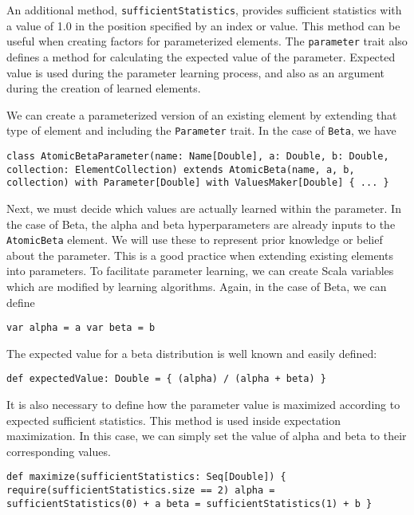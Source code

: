 An additional method,  \texttt{sufficientStatistics}, provides sufficient statistics with a value of 1.0 in the position specified by an index or value. This method can be useful when creating factors for parameterized elements. The \texttt{parameter} trait also defines a method for calculating the expected value of the parameter. Expected value is used during the parameter learning process, and also as an argument during the creation of learned elements.

We can create a parameterized version of an existing element by extending that type of element and including the \texttt{Parameter} trait. In the case of \texttt{Beta}, we have

\begin{flushleft}
\texttt{class AtomicBetaParameter(name: Name[Double], a: Double, b: Double, collection: ElementCollection) extends AtomicBeta(name, a, b, collection) with
Parameter[Double] with ValuesMaker[Double] \{ ... \}
}
\end{flushleft}

Next, we must decide which values are actually learned within the parameter. In the case of Beta, the alpha and beta hyperparameters are already inputs to the \texttt{AtomicBeta} element. We will use these to represent prior knowledge or belief about the parameter. This is a good practice when extending existing elements into parameters. To facilitate parameter learning, we can create Scala variables which are modified by learning algorithms. Again, in the case of Beta, we can define

\begin{flushleft}
\texttt{var alpha = a 
\newline var beta = b
}
\end{flushleft}

The expected value for a beta distribution is well known and easily defined:

\begin{flushleft}
\texttt{def expectedValue: Double = \{
\newline \tab (alpha) / (alpha + beta)
\newline \}
}
\end{flushleft}

It is also necessary to define how the parameter value is maximized according to expected sufficient statistics. This method is used inside expectation maximization. In this case, we can simply set the value of alpha and beta to their corresponding values.

\begin{flushleft}
\texttt{def maximize(sufficientStatistics: Seq[Double]) \{
\newline \tab require(sufficientStatistics.size == 2)
\newline \tab alpha = sufficientStatistics(0) + a
\newline \tab beta = sufficientStatistics(1) + b
\newline \}
}
\end{flushleft}

